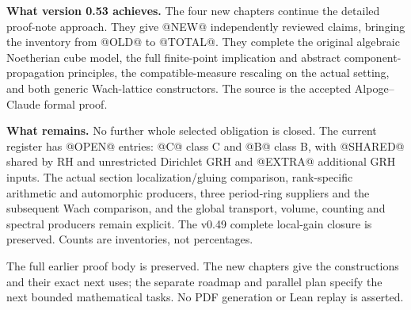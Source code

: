 \textbf{What version 0.53 achieves.}
The four new chapters continue the detailed proof-note approach.
They give @NEW@ independently reviewed claims, bringing the inventory
from @OLD@ to @TOTAL@. They complete the original algebraic
Noetherian cube model, the full finite-point implication and abstract
component-propagation principles, the compatible-measure rescaling
on the actual setting, and both generic Wach-lattice constructors.
The source is the accepted Alpoge--Claude formal proof.

\medskip
\textbf{What remains.}
No further whole selected obligation is closed. The current register has
@OPEN@ entries: @C@ class C and @B@ class B, with @SHARED@ shared by
RH and unrestricted Dirichlet GRH and @EXTRA@ additional GRH inputs.
The actual section localization/gluing comparison, rank-specific
arithmetic and automorphic producers, three period-ring suppliers and
the subsequent Wach comparison, and the global transport, volume,
counting and spectral producers remain explicit. The v0.49 complete
local-gain closure is preserved. Counts are inventories, not percentages.

\medskip
The full earlier proof body is preserved. The new chapters give the
constructions and their exact next uses; the separate roadmap and
parallel plan specify the next bounded mathematical tasks. No PDF
generation or Lean replay is asserted.

